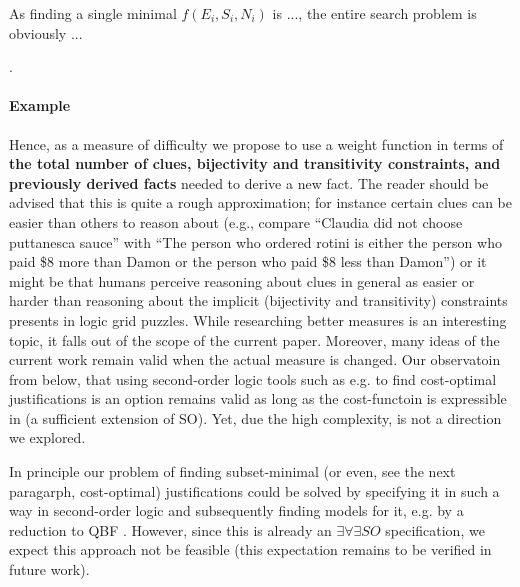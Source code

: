 As finding a single minimal $f(E_i,S_i,N_i)$ is ..., the entire search problem is obviously ...

.

\paragraph{Example} 
Hence, as a measure of difficulty we propose to use a weight function in terms of \textbf{the total number of clues, bijectivity and transitivity constraints, and previously derived facts} needed to derive a new fact. 
The reader should be advised that this is quite a rough approximation; for instance certain clues can be easier than others to reason about (e.g., compare ``Claudia did not choose puttanesca sauce'' with ``The person who ordered rotini is either the person who paid \$8 more than Damon or the person who paid \$8 less than Damon'') or it might be that humans perceive reasoning about clues in general as easier or harder than reasoning about the implicit (bijectivity and transitivity) constraints presents in logic grid puzzles. While researching better measures is an interesting topic, it falls out of the scope of the current paper. Moreover, many ideas of the current work remain valid when the actual measure is changed. 
Our observatoin from below, that using second-order logic tools such as e.g. \cite{proB,kr/BogaertsTS16} to find cost-optimal justifications is an option remains valid as long as the cost-functoin is expressible in (a sufficient extension of SO). Yet, due the high complexity, is not a direction we explored. 

In principle our problem of finding subset-minimal (or even, see the next paragarph, cost-optimal) justifications could be solved by specifying it in such a way in second-order logic and subsequently finding models for it, e.g. by a reduction to QBF \cite{kr/BogaertsTS16,kr/vanderHallenJ18}. 
However, since this is already an $\exists\forall\exists SO$ specification, we expect this approach not be feasible (this expectation remains to be verified in future work). 

